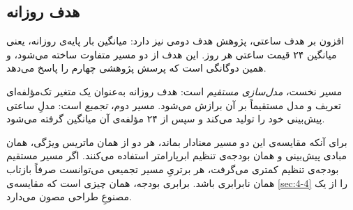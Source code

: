 \subsection*{هدف روزانه}

افزون بر هدف ساعتی، پژوهش هدف دومی نیز دارد: میانگین بار پایه‌ی روزانه، یعنی میانگین
۲۴ قیمت ساعتی هر روز. این هدف از دو مسیر متفاوت ساخته می‌شود، و همین دوگانگی است که
پرسش پژوهشی چهارم را پاسخ می‌دهد.

مسیر نخست، \emph{مدل‌سازی مستقیم} است: هدف روزانه به‌عنوان یک متغیر تک‌مؤلفه‌ای
تعریف و مدل مستقیماً بر آن برازش می‌شود. مسیر دوم، \emph{تجمیع} است: مدلِ ساعتی
پیش‌بینی خود را تولید می‌کند و سپس از ۲۴ مؤلفه‌ی آن میانگین گرفته می‌شود.

برای آنکه مقایسه‌ی این دو مسیر معنادار بماند، هر دو از همان ماتریس ویژگی، همان مبادی
پیش‌بینی و همان بودجه‌ی تنظیم ابرپارامتر استفاده می‌کنند. اگر مسیر مستقیم بودجه‌ی
تنظیم کمتری می‌گرفت، هر برتریِ مسیر تجمیعی می‌توانست صرفاً بازتاب همان نابرابری
باشد. برابری بودجه، همان چیزی است که مقایسه‌ی \cref{sec:4-4} را از یک مصنوعِ طراحی مصون
می‌دارد.
